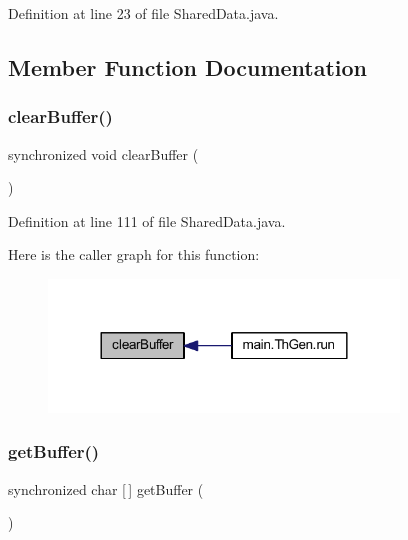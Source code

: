 Definition at line 23 of file Shared\+Data.\+java.



\subsection{Member Function Documentation}
\mbox{\label{classmain_1_1_shared_data_a00aedde57a20e2963ebc672ae9ce97d4}} 
\subsubsection{\texorpdfstring{clear\+Buffer()}{clearBuffer()}}
{\footnotesize\ttfamily synchronized void clear\+Buffer (\begin{DoxyParamCaption}{ }\end{DoxyParamCaption})}



Definition at line 111 of file Shared\+Data.\+java.

Here is the caller graph for this function\+:
\nopagebreak
\begin{figure}[H]
\begin{center}
\leavevmode
\includegraphics[width=264pt]{classmain_1_1_shared_data_a00aedde57a20e2963ebc672ae9ce97d4_icgraph}
\end{center}
\end{figure}
\mbox{\label{classmain_1_1_shared_data_a834679087d3e57272392eaf389f13a80}} 
\subsubsection{\texorpdfstring{get\+Buffer()}{getBuffer()}}
{\footnotesize\ttfamily synchronized char \mbox{[}$\,$\mbox{]} get\+Buffer (\begin{DoxyParamCaption}{ }\end{DoxyParamCaption})}



